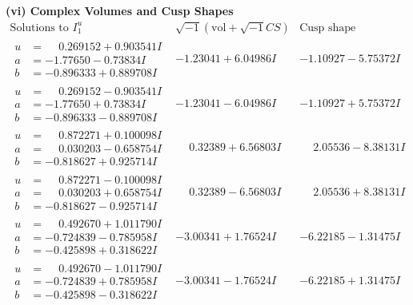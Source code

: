 \documentclass[1p]{elsarticle_modified}
\theoremstyle{definition}
\newcommand{\I}{\sqrt{-1}}
\begin{document}
\newpage\flushleft \textbf{(vi) Complex Volumes and Cusp Shapes}
$$\begin{array}{c|c|c}  
\text{Solutions to }I^u_{1}& \I (\text{vol} + \sqrt{-1}CS) & \text{Cusp shape}\\
 \hline 
\begin{aligned}
u &= \phantom{-}0.269152 + 0.903541 I \\
a &= -1.77650 - 0.73834 I \\
b &= -0.896333 + 0.889708 I\end{aligned}
 & -1.23041 + 6.04986 I & -1.10927 - 5.75372 I \\ \hline\begin{aligned}
u &= \phantom{-}0.269152 - 0.903541 I \\
a &= -1.77650 + 0.73834 I \\
b &= -0.896333 - 0.889708 I\end{aligned}
 & -1.23041 - 6.04986 I & -1.10927 + 5.75372 I \\ \hline\begin{aligned}
u &= \phantom{-}0.872271 + 0.100098 I \\
a &= \phantom{-}0.030203 - 0.658754 I \\
b &= -0.818627 + 0.925714 I\end{aligned}
 & \phantom{-}0.32389 + 6.56803 I & \phantom{-}2.05536 - 8.38131 I \\ \hline\begin{aligned}
u &= \phantom{-}0.872271 - 0.100098 I \\
a &= \phantom{-}0.030203 + 0.658754 I \\
b &= -0.818627 - 0.925714 I\end{aligned}
 & \phantom{-}0.32389 - 6.56803 I & \phantom{-}2.05536 + 8.38131 I \\ \hline\begin{aligned}
u &= \phantom{-}0.492670 + 1.011790 I \\
a &= -0.724839 - 0.785958 I \\
b &= -0.425898 + 0.318622 I\end{aligned}
 & -3.00341 + 1.76524 I & -6.22185 - 1.31475 I \\ \hline\begin{aligned}
u &= \phantom{-}0.492670 - 1.011790 I \\
a &= -0.724839 + 0.785958 I \\
b &= -0.425898 - 0.318622 I\end{aligned}
 & -3.00341 - 1.76524 I & -6.22185 + 1.31475 I \\ \hline\begin{aligned}

\end{aligned}
\end{array}$$
\end{document}
